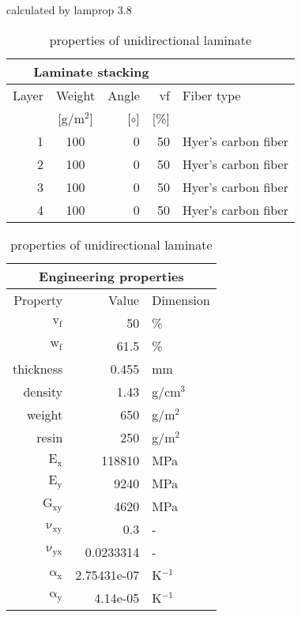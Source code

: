 \begin{table}[!htbp]
  \renewcommand{\arraystretch}{1.2}
  \caption{\label{tab:unidirectional laminate}properties of unidirectional laminate}
  \centering\footnotesize{\rule{0pt}{10pt}
  \tiny calculated by lamprop 3.8\\[3pt]}
    \begin{tabular}[t]{rcrrl}
      \multicolumn{4}{c}{\small\textbf{Laminate stacking}}\\[0.1em]
      \toprule %
      Layer & Weight & Angle & vf & Fiber type\\
            & [g/m$^2$] & [$\circ$] & [\%]\\
      \midrule
      1 &  100 &     0 & 50 & Hyer's carbon fiber\\
      2 &  100 &     0 & 50 & Hyer's carbon fiber\\
      3 &  100 &     0 & 50 & Hyer's carbon fiber\\
      4 &  100 &     0 & 50 & Hyer's carbon fiber\\
      \bottomrule
    \end{tabular}\hspace{0.02\textwidth}
    \begin{tabular}[t]{rrl}
      \multicolumn{3}{c}{\small\textbf{Engineering properties}}\\[0.1em]
      \toprule
      Property & Value & Dimension\\
      \midrule
      $\mathrm{v_f}$ & 50 &\%\\
      $\mathrm{w_f}$ & 61.5 &\%\\
      thickness & 0.455 & mm\\
      density & 1.43 & g/cm$^3$\\
      weight & 650 & g/m$^2$\\
      resin & 250 & g/m$^2$\\
      \midrule
      $\mathrm{E_x}$ &   118810 & MPa\\
      $\mathrm{E_y}$ &     9240 & MPa\\
      $\mathrm{G_{xy}}$ &     4620 & MPa\\
      $\mathrm{\nu_{xy}}$ & 0.3 &-\\
      $\mathrm{\nu_{yx}}$ & 0.0233314 &-\\
      $\mathrm{\alpha_x}$ & 2.75431e-07 & K$^{-1}$\\
      $\mathrm{\alpha_y}$ & 4.14e-05 & K$^{-1}$\\
      \bottomrule
    \end{tabular}

\end{table}
